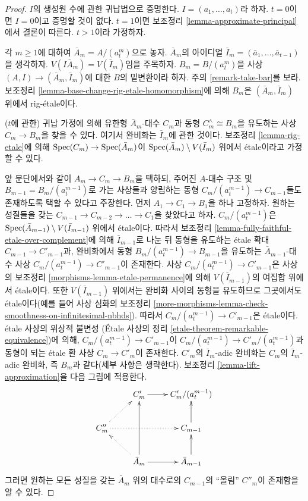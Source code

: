 \begin{proof}
$I$의 생성원 수에 관한 귀납법으로 증명한다.
$I = (a_1, \ldots, a_t)$라 하자. $t = 0$이면 $I = 0$이고
증명할 것이 없다. $t = 1$이면 보조정리
\ref{lemma-approximate-principal}에서 결론이 따른다. $t > 1$이라 가정하자.

\medskip\noindent
각 $m \geq 1$에 대하여 $\bar A_m = A/(a_t^m)$으로 놓자.
$\bar A_m$의 아이디얼 $\bar I_m = (\bar a_1, \ldots, \bar a_{t - 1})$을 생각하자.
$V(I \bar A_m) = V(\bar I_m)$임을 주목하자.
$B_m = B/(a_t^m)$을 사상 $(A, I) \to (\bar A_m, \bar I_m)$에 대한
$B$의 밑변환이라 하자. 주의 \ref{remark-take-bar}를 보라.
보조정리 \ref{lemma-base-change-rig-etale-homomorphism}에 의해
$B_m$은 $(\bar A_m, \bar I_m)$ 위에서 rig-\'etale이다.

\medskip\noindent
($t$에 관한) 귀납 가정에 의해 유한형 $\bar A_m$-대수 $C_m$과
동형 $C_m^\wedge \cong B_m$을 유도하는 사상 $C_m \to B_m$을 찾을 수 있다.
여기서 완비화는 $\bar I_m$에 관한 것이다.
보조정리 \ref{lemma-rig-etale}에 의해
$\mathop{\mathrm{Spec}}(C_m) \to \mathop{\mathrm{Spec}}(\bar A_m)$이
$\mathop{\mathrm{Spec}}(\bar A_m) \setminus V(\bar I_m)$ 위에서 \'etale이라고 가정할 수 있다.

\medskip\noindent
앞 문단에서와 같이 $A_m \to C_m \to B_m$을 택하되,
주어진 $A$-대수 구조 및 $B_{m - 1} = B_m/(a_t^{m - 1})$로 가는 사상들과
양립하는 동형 $C_m/(a_t^{m - 1}) \to C_{m - 1}$들도 존재하도록
택할 수 있다고 주장한다.
먼저 $A_1 \to C_1 \to B_1$을 하나 고정하자.
원하는 성질들을 갖는 $C_{m - 1} \to C_{m - 2} \to \ldots \to C_1$을
찾았다고 하자. $C_m/(a_t^{m - 1})$은
$\mathop{\mathrm{Spec}}(\bar A_{m - 1}) \setminus V(\bar I_{m - 1})$ 위에서 \'etale이다.
따라서 보조정리 \ref{lemma-fully-faithful-etale-over-complement}에 의해
$\bar I_{m - 1}$로 나눈 뒤 동형을 유도하는 \'etale 확대
$C_{m - 1} \to C'_{m - 1}$과,
완비화에서 동형 $B_m/(a_t^{m - 1}) \to B_{m - 1}$을 유도하는
$\bar A_{m - 1}$-대수 사상 $C_m/(a_t^{m - 1}) \to C'_{m - 1}$이 존재한다.
사상 $C_m/(a_t^{m - 1}) \to C'_{m - 1}$은
사상의 보조정리 \ref{morphisms-lemma-etale-permanence}에 의해
$V(\bar I_{m - 1})$의 여집합 위에서 \'etale이다.
또한 $V(\bar I_{m - 1})$ 위에서는 완비화 사이의 동형을 유도하므로
그곳에서도 \'etale이다(예를 들어 사상 심화의 보조정리
\ref{more-morphisms-lemma-check-smoothness-on-infinitesimal-nbhds}).
따라서 $C_m/(a_t^{m - 1}) \to C'_{m - 1}$은 \'etale이다.
\'etale 사상의 위상적 불변성
(\'Etale 사상의 정리 \ref{etale-theorem-remarkable-equivalence})에 의해,
$C_m/(a_t^{m - 1}) \to C'_{m - 1}$이
$C_m/(a_t^{m - 1}) \to C'_m/(a_t^{m - 1})$과 동형이 되는
\'etale 환 사상 $C_m \to C'_m$이 존재한다.
$C'_m$의 $\bar I_m$-adic 완비화는 $C_m$의 $\bar I_m$-adic 완비화,
즉 $B_m$과 같다(세부 사항은 생략한다).
보조정리 \ref{lemma-lift-approximation}을 다음 그림에 적용한다.
$$
\xymatrix{
 & C'_m \ar[r] & C'_m/(a_t^{m - 1}) \\
C''_m \ar@{..>}[ru] \ar@{..>}[rr] & & C_{m - 1} \ar[u] \\
 & \bar A_m \ar[r] \ar[uu] \ar@{..>}[lu] & \bar A_{m - 1} \ar[u]
}
$$
그러면 원하는 모든 성질을 갖는 $\bar A_m$ 위의 대수로의
$C_{m - 1}$의 ``올림'' $C''_m$이 존재함을 알 수 있다.


\end{proof}
